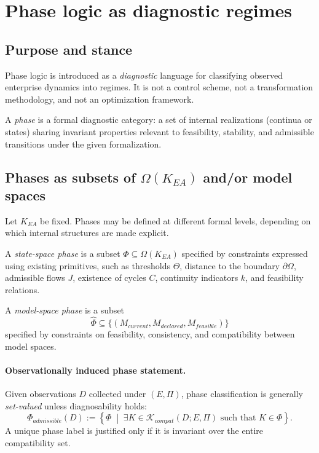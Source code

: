 \section{Phase logic as diagnostic regimes}
\label{sec:pdf2_phase_logic}

\subsection{Purpose and stance}
Phase logic is introduced as a \emph{diagnostic} language for classifying observed
enterprise dynamics into regimes.
It is not a control scheme, not a transformation methodology, and not an
optimization framework.

A \emph{phase} is a formal diagnostic category: a set of internal realizations
(continua or states) sharing invariant properties relevant to feasibility,
stability, and admissible transitions under the given formalization.

\subsection{Phases as subsets of \texorpdfstring{$\Omega(K_{EA})$}{Omega(K EA)} and/or model spaces}

Let $K_{EA}$ be fixed.
Phases may be defined at different formal levels, depending on which internal
structures are made explicit.

\begin{definition}
\label{def:state_space_phase}
A \emph{state-space phase} is a subset $\Phi \subseteq \Omega(K_{EA})$ specified
by constraints expressed using existing primitives, such as thresholds $\Theta$,
distance to the boundary $\partial\Omega$, admissible flows $J$, existence of
cycles $C$, continuity indicators $k$, and feasibility relations.
\end{definition}

\begin{definition}
\label{def:model_space_phase}
A \emph{model-space phase} is a subset
\[
\widehat{\Phi} \subseteq \{(M_{current}, M_{declared}, M_{feasible})\}
\]
specified by constraints on feasibility, consistency, and compatibility between
model spaces.
\end{definition}

\paragraph{Observationally induced phase statement.}
Given observations $D$ collected under $(E,\Pi)$, phase classification is
generally \emph{set-valued} unless diagnosability holds:
\[
\Phi_{admissible}(D) :=
\left\{\Phi \;\middle|\; \exists K \in \mathcal{K}_{compat}(D;E,\Pi)
\text{ such that } K \in \Phi \right\}.
\]
A unique phase label is justified only if it is invariant over the entire
compatibility set.

